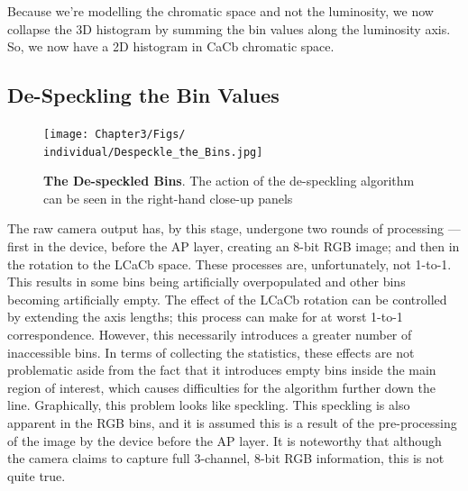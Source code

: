 Because we're modelling the chromatic space and not the luminosity, we now collapse the 3D histogram by summing the bin values along the luminosity axis. So, we now have a 2D histogram in CaCb chromatic space.





\subsection{De-Speckling the Bin Values}\label{sec:DeSpeckle}

\begin{figure}[h!]
  \centering
    \texttt{[image: Chapter3/Figs/\\individual/Despeckle\_the\_Bins.jpg]}
        \caption{\textbf{The De-speckled Bins}. The action of the de-speckling algorithm can be seen in the right-hand close-up panels}  \label{fig:Despeckle_the_Bins}
    \end{figure}
    
The raw camera output has, by this stage, undergone two rounds of processing --- first in the device, before the AP layer, creating an 8-bit RGB image; and then in the rotation to the LCaCb space. These processes are, unfortunately, not 1-to-1. This results in some bins being artificially overpopulated and other bins becoming artificially empty. The effect of the LCaCb rotation can be controlled by extending the axis lengths; this process can make for at worst 1-to-1 correspondence. However, this necessarily introduces a greater number of inaccessible bins. In terms of collecting the statistics, these effects are not problematic aside from the fact that it introduces empty bins inside the main region of interest, which causes difficulties for the algorithm further down the line. Graphically, this problem looks like speckling. This speckling is also apparent in the RGB bins, and it is assumed this is a result of the pre-processing of the image by the device before the AP layer. It is noteworthy that although the camera claims to capture full 3-channel, 8-bit RGB information, this is not quite true. 

